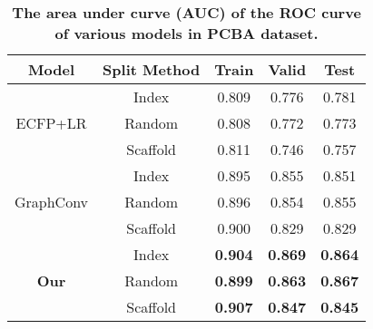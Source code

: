 \documentclass[letterpaper]{article} \usepackage{aaai18}  \usepackage{times}  \usepackage{helvet}  \usepackage{courier}  \usepackage{url}  \usepackage{graphicx}  \usepackage{amsmath}
\begin{document}
\begin{table}[!h]
\caption{\textbf{The area under curve (AUC) of the ROC curve of various models in PCBA dataset.} }
\label{tbl::pcba}
\vskip 0.15in
\begin{center}
\begin{small}
\begin{tabular}{|c|c|c|c|c|}
\hline
Model                           & Split Method    & Train         &Valid         & Test \\
\hline
\multirow{3}{*}{ECFP+LR}        & Index      &   0.809       &   0.776      &   0.781  \\
                                & Random     &   0.808       &   0.772      &   0.773  \\
                                & Scaffold   &   0.811       &   0.746      &   0.757  \\
\hline
\multirow{3}{*}{GraphConv}      & Index      &   0.895       &   0.855      &   0.851  \\
                                & Random     &   0.896       &   0.854      &   0.855  \\
                                & Scaffold   &   0.900       &   0.829      &   0.829  \\
\hline
\multirow{3}{*}{\textbf{Our}}   & Index      &\textbf{0.904} &\textbf{0.869} &\textbf{0.864}\\
                                & Random     &\textbf{0.899} &\textbf{0.863} &\textbf{0.867}\\
                                & Scaffold   &\textbf{0.907} &\textbf{0.847} &\textbf{0.845}\\  
\hline
\end{tabular}
\end{small}
\end{center}
\vskip -0.1in
\end{table}
\end{document}
